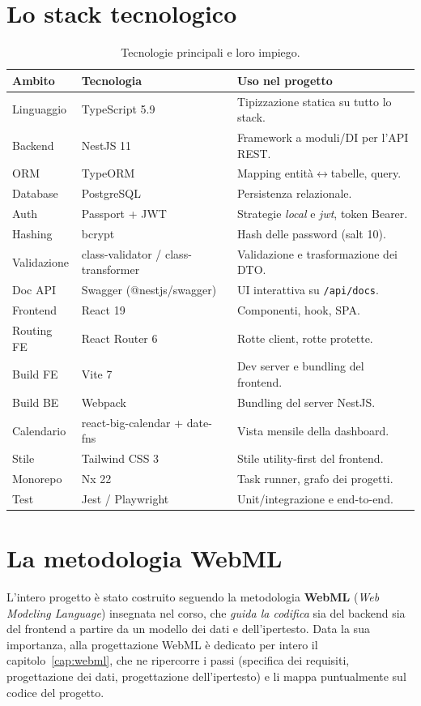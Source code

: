 \documentclass[11pt,a4paper,oneside]{report}
\newcommand{\code}[1]{\texttt{\small #1}}
\begin{document}
\section{Lo stack tecnologico}
\begin{table}[h]
\centering
\renewcommand{\arraystretch}{1.2}
\begin{tabularx}{\linewidth}{@{}llX@{}}
\toprule
\textbf{Ambito} & \textbf{Tecnologia} & \textbf{Uso nel progetto} \\
\midrule
Linguaggio   & TypeScript 5.9      & Tipizzazione statica su tutto lo stack. \\
Backend      & NestJS 11           & Framework a moduli/DI per l'API REST. \\
ORM          & TypeORM             & Mapping entità$\leftrightarrow$tabelle, query. \\
Database     & PostgreSQL          & Persistenza relazionale. \\
Auth         & Passport + JWT      & Strategie \emph{local} e \emph{jwt}, token Bearer. \\
Hashing      & bcrypt              & Hash delle password (salt 10). \\
Validazione  & class-validator / class-transformer & Validazione e trasformazione dei DTO. \\
Doc API      & Swagger (@nestjs/swagger) & UI interattiva su \code{/api/docs}. \\
Frontend     & React 19            & Componenti, hook, SPA. \\
Routing FE   & React Router 6      & Rotte client, rotte protette. \\
Build FE     & Vite 7              & Dev server e bundling del frontend. \\
Build BE     & Webpack             & Bundling del server NestJS. \\
Calendario   & react-big-calendar + date-fns & Vista mensile della dashboard. \\
Stile        & Tailwind CSS 3      & Stile utility-first del frontend. \\
Monorepo     & Nx 22               & Task runner, grafo dei progetti. \\
Test         & Jest / Playwright   & Unit/integrazione e end-to-end. \\
\bottomrule
\end{tabularx}
\caption{Tecnologie principali e loro impiego.}
\end{table}

\section{La metodologia WebML}
L'intero progetto è stato costruito seguendo la metodologia \textbf{WebML}
(\emph{Web Modeling Language}) insegnata nel corso, che \emph{guida la codifica}
sia del backend sia del frontend a partire da un modello dei dati e
dell'ipertesto. Data la sua importanza, alla progettazione WebML è dedicato per
intero il capitolo~\ref{cap:webml}, che ne ripercorre i passi (specifica dei
requisiti, progettazione dei dati, progettazione dell'ipertesto) e li mappa
puntualmente sul codice del progetto.
\end{document}
